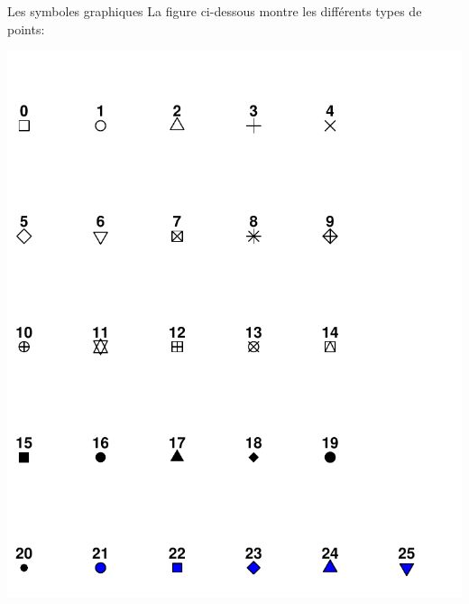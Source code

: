 \documentclass[
  8pt,
  ignorenonframetext,
]{beamer}
\begin{document}
\begin{frame}{Les symboles graphiques}
\protect\hypertarget{les-symboles-graphiques}{}
La figure ci-dessous montre les différents types de points:

\begin{center}\includegraphics{Chap2_R_files/figure-beamer/unnamed-chunk-5-1} \end{center}
\end{frame}
\end{document}

